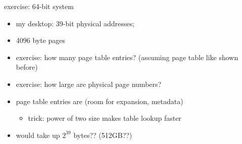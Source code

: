\usetikzlibrary{positioning,shapes.callouts}

\begin{frame}[fragile,label=64bExA]{exercise: 64-bit system}
\begin{itemize}
\item my desktop: 39-bit physical addresses; 
\item 4096 byte pages
\item<3-> exercise: how many page table entries? (assuming page table like shown before)
\item<3-> exercise: how large are physical page numbers?
\item<5-> page table entries are  (room for expansion, metadata)
    \begin{itemize}
    \item trick: power of two size makes table lookup faster
    \end{itemize}
\item<5-> would take up $2^{39}$ bytes?? (512GB??)
\end{itemize}
\end{frame}

